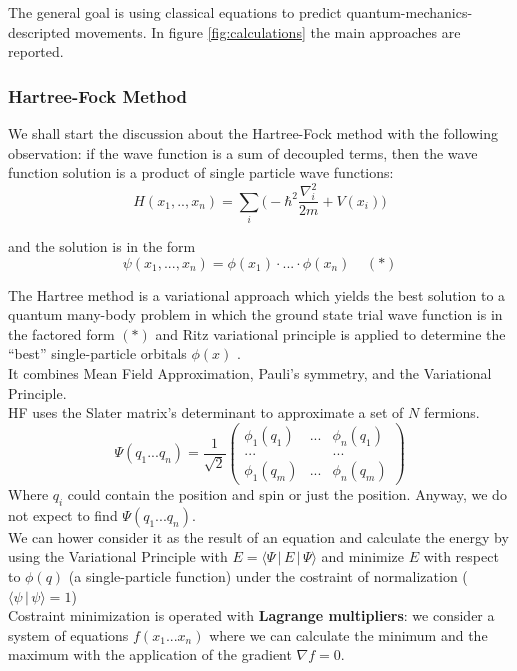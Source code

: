 The general goal is using classical equations to predict quantum-mechanics-descripted movements. In figure \ref{fig:calculations} the main approaches are reported.\\

\subsubsection{Hartree-Fock Method}
We shall start the discussion about the Hartree-Fock method with the following observation: if the wave function is a sum of decoupled terms, then the wave function solution is a product of single particle wave functions:
 \[
 H(x_1,.., x_n) = \sum_i \bigg(-\hbar^2 \frac{\nabla_i^2}{2m} + V(x_i) \bigg)
 \]
 
and the solution is in the form 
 \[
 \psi(x_1, ..., x_n) = \phi(x_1) \cdot ... \cdot \phi(x_n) \;\;\;\; (*)
 \]

The Hartree method is a variational approach which yields the best solution
to a quantum many-body problem in which the ground state trial wave
function is in the factored form $(*)$ and Ritz variational principle is applied to
determine the “best” single-particle orbitals $\phi(x)$ . \\
It combines Mean Field Approximation, Pauli's symmetry, and the Variational Principle.\\
HF uses the Slater matrix's determinant to approximate a set of $N$ fermions.
\[
\Psi(q_1...q_n)=\frac{1}{\sqrt{2}}
\begin{pmatrix}
\phi_1(q_1)&...&\phi_n(q_1)\\
... & &...\\
\phi_1(q_m)&...&\phi_n(q_m)
\end{pmatrix}
\]
Where $q_i$ could contain the position and spin or just the position. Anyway, we do not expect to find $\Psi(q_1...q_n)$. \\
We can hower consider it as the result of an equation and calculate the energy by using the Variational Principle with $E=\langle \Psi\,|\,E\,|\,\Psi \rangle$ and minimize $E$ with respect to $\phi(q)$ (a single-particle function) under the costraint of normalization ($\langle \psi\,|\,\psi \rangle =1$)\\
Costraint minimization is operated with \textbf{Lagrange multipliers}: we consider a system of equations $f(x_1...x_n)$ where we can calculate the minimum and the maximum with the application of the gradient $\nabla f=0$.\\


